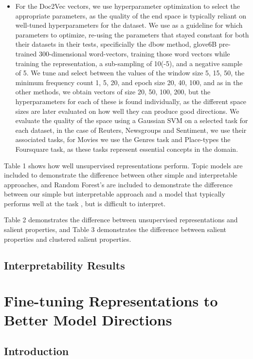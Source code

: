 \documentclass{article}
\begin{document}
\begin{itemize}
     \item For the Doc2Vec vectors, we use hyperparameter optimization to select the appropriate parameters, as the quality of the end space is typically reliant on well-tuned hyperparameters for the dataset. We use \cite{Lau2014} as a guideline for which parameters to optimize, re-using the parameters that stayed constant for both their datasets in their tests, specificially the dbow method, glove6B pre-trained 300-dimensional word-vectors, training those word vectors while training the representation, a sub-sampling of 10(-5), and a negative sample of 5. We tune and select between the values of the window size {5, 15, 50}, the minimum frequency count {1, 5, 20}, and epoch size {20, 40, 100}, and as in the other methods, we obtain vectors of size {20, 50, 100, 200}, but the hyperparameters for each of these is found individually, as the different space sizes are later evaluated on how well they can produce good directions. We evaluate the quality of the space using a Gaussian SVM on a selected task for each dataset, in the case of Reuters, Newsgroups and Sentiment, we use their associated tasks, for Movies we use the Genres task and Place-types the Foursquare task, as these tasks represent essential concepts in the domain. 
     
     
\end{itemize}
 
 Table 1 shows how well unsupervised representations perform. Topic models are included to demonstrate the difference between other simple and interpretable approaches, and Random Forest's are included to demonstrate the difference between our simple but interpretable approach and a model that typically performs well at the task \cite{Fern2014}, but is  difficult to interpret.
 
 Table 2 demonstrates the difference between unsupervised representations and salient properties, and Table 3 demonstrates the difference between salient properties and clustered salient properties.
 \subsection{Interpretability Results}
 
 \section{Fine-tuning Representations to Better Model Directions}
 \subsection{Introduction}
\end{document}
